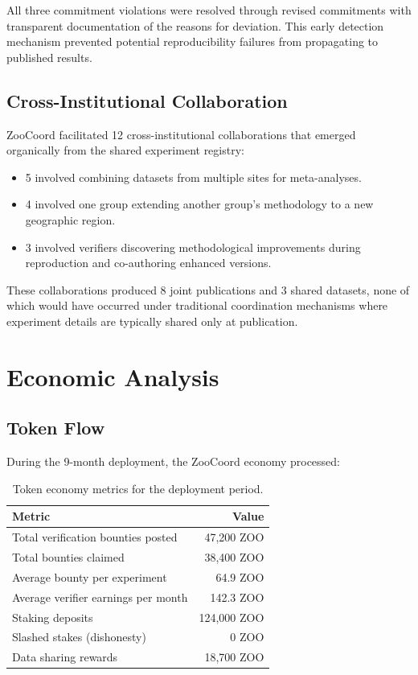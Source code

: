 \documentclass[11pt,a4paper]{article}
\begin{document}
All three commitment violations were resolved through revised commitments with transparent documentation of the reasons for deviation.
This early detection mechanism prevented potential reproducibility failures from propagating to published results.

\subsection{Cross-Institutional Collaboration}

ZooCoord facilitated 12 cross-institutional collaborations that emerged organically from the shared experiment registry:

\begin{itemize}[leftmargin=*]
    \item 5 involved combining datasets from multiple sites for meta-analyses.
    \item 4 involved one group extending another group's methodology to a new geographic region.
    \item 3 involved verifiers discovering methodological improvements during reproduction and co-authoring enhanced versions.
\end{itemize}

These collaborations produced 8 joint publications and 3 shared datasets, none of which would have occurred under traditional coordination mechanisms where experiment details are typically shared only at publication.

\section{Economic Analysis}
\label{sec:economics}

\subsection{Token Flow}

During the 9-month deployment, the ZooCoord economy processed:

\begin{table}[H]
\centering
\caption{Token economy metrics for the deployment period.}
\label{tab:economics}
\begin{tabular}{@{}lr@{}}
\toprule
\textbf{Metric} & \textbf{Value} \\
\midrule
Total verification bounties posted & 47,200 ZOO \\
Total bounties claimed & 38,400 ZOO \\
Average bounty per experiment & 64.9 ZOO \\
Average verifier earnings per month & 142.3 ZOO \\
Staking deposits & 124,000 ZOO \\
Slashed stakes (dishonesty) & 0 ZOO \\
Data sharing rewards & 18,700 ZOO \\
\bottomrule
\end{tabular}
\end{table}
\end{document}
